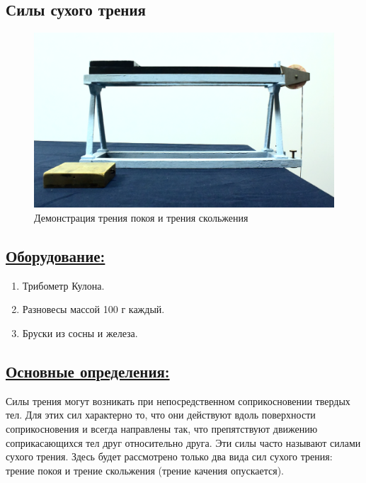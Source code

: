 \documentclass[14pt,a4paper,oneside]{extarticle}	%
\begin{document}

	
	\begin{center}
		\subsection*{Силы сухого трения}
	\end{center}
	
	\begin{figure}[H]
		\centering 	
		\includegraphics[width=0.9\linewidth]{friction-4.png}
		\caption{Демонстрация трения покоя и трения скольжения}
		\label{friction-4}
	\end{figure}
	
	\subsection*{\underline{Оборудование:}}
	
	\begin{enumerate} 
		\item Трибометр Кулона.
		\item Разновесы массой 100 г каждый.
		\item Бруски из сосны и железа.
		
	\end{enumerate}

	\newpage	
	\subsection*{\underline{Основные определения:}}
	
Силы трения могут возникать при непосредственном соприкосновении твердых тел.
Для этих сил характерно то, что они действуют вдоль поверхности соприкосновения и всегда направлены 
	так, что препятствуют движению соприкасающихся тел друг относительно друга.
	Эти силы часто называют силами сухого трения. 
	Здесь будет рассмотрено только два вида сил сухого трения: трение покоя 
	и трение скольжения (трение качения опускается).
	
\end{document}
